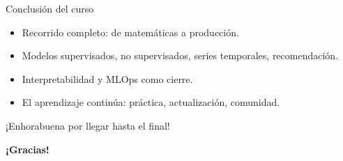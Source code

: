 \documentclass[aspectratio=169, 10pt, xcolor=table]{beamer}
\begin{document}
\begin{frame}{Conclusión del curso}
    \begin{itemize}
        \item Recorrido completo: de matemáticas a producción.
        \item Modelos supervisados, no supervisados, series temporales, recomendación.
        \item Interpretabilidad y MLOps como cierre.
        \item El aprendizaje continúa: práctica, actualización, comunidad.
    \end{itemize}
    \vspace{1cm}
    \centering
    \Large{¡Enhorabuena por llegar hasta el final!}
\end{frame}

\begin{frame}
    \centering
    \Huge \textbf{¡Gracias!}

\end{frame}
\end{document}
